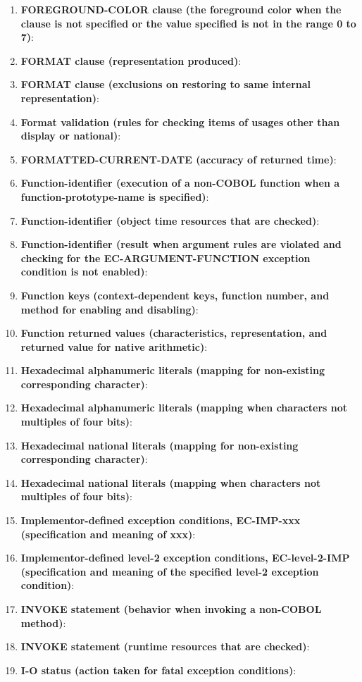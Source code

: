 \begin{enumerate}
\item \textbf{FOREGROUND-COLOR clause (the foreground color when the clause is not specified or the value specified is not in the range 0 to 7)}:
\item \textbf{FORMAT clause (representation produced)}:
\item \textbf{FORMAT clause (exclusions on restoring to same internal representation)}:
\item \textbf{Format validation (rules for checking items of usages other than display or national)}:
\item \textbf{FORMATTED-CURRENT-DATE (accuracy of returned time)}:
\item \textbf{Function-identifier (execution of a non-COBOL function when a function-prototype-name is specified)}:
\item \textbf{Function-identifier (object time resources that are checked)}:
\item \textbf{Function-identifier (result when argument rules are violated and checking for the EC-ARGUMENT-FUNCTION exception condition is not enabled)}:
\item \textbf{Function keys (context-dependent keys, function number, and method for enabling and disabling)}:
\item \textbf{Function returned values (characteristics, representation, and returned value for native arithmetic)}:
\item \textbf{Hexadecimal alphanumeric literals (mapping for non-existing corresponding character)}:
\item \textbf{Hexadecimal alphanumeric literals (mapping when characters not multiples of four bits)}:
\item \textbf{Hexadecimal national literals (mapping for non-existing corresponding character)}:
\item \textbf{Hexadecimal national literals (mapping when characters not multiples of four bits)}:
\item \textbf{Implementor-defined exception conditions, EC-IMP-xxx (specification and meaning of xxx)}:
\item \textbf{Implementor-defined level-2 exception conditions, EC-level-2-IMP (specification and meaning of the specified level-2 exception condition)}:
\item \textbf{INVOKE statement (behavior when invoking a non-COBOL method)}:
\item \textbf{INVOKE statement (runtime resources that are checked)}:
\item \textbf{I-O status (action taken for fatal exception conditions)}:

\end{enumerate}
